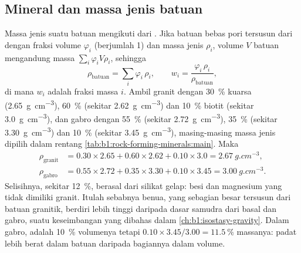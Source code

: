 \subsection{Mineral dan massa jenis batuan}

Massa jenis suatu batuan mengikuti dari . Jika batuan bebas pori tersusun dari  dengan fraksi volume $\varphi_i$ (berjumlah 1) dan massa jenis $\rho_i$, volume $V$ batuan mengandung massa
$\sum_i \varphi_i V \rho_i$, sehingga
\[
  \rho_{\text{batuan}} = \sum_i \varphi_i\,\rho_i ,
  \qquad
  w_i = \frac{\varphi_i\,\rho_i}{\rho_{\text{batuan}}},
\]
di mana $w_i$ adalah fraksi massa  $i$. Ambil granit dengan \qty{30}{\percent} kuarsa (\qty{2.65}{g.cm^{-3}}), \qty{60}{\percent}  (sekitar \qty{2.62}{g.cm^{-3}}) dan \qty{10}{\percent} biotit (sekitar \qty{3.0}{g.cm^{-3}}), dan gabro dengan \qty{55}{\percent}  (sekitar \qty{2.72}{g.cm^{-3}}), \qty{35}{\percent}  (sekitar \qty{3.30}{g.cm^{-3}}) dan \qty{10}{\percent}  (sekitar \qty{3.45}{g.cm^{-3}}), masing-masing massa jenis dipilih dalam rentang \cref{tab:b1:rock-forming-minerals:main}. Maka
\begin{align*}
  \rho_{\text{granit}} &= 0.30\times2.65 + 0.60\times2.62 + 0.10\times3.0
  = \qty{2.67}{g.cm^{-3}},\\
  \rho_{\text{gabro}} &= 0.55\times2.72 + 0.35\times3.30 + 0.10\times3.45
  = \qty{3.00}{g.cm^{-3}}.
\end{align*}
Selisihnya, sekitar \qty{12}{\percent}, berasal dari silikat gelap: besi dan magnesium yang tidak dimiliki granit. Itulah sebabnya benua, yang sebagian besar tersusun dari batuan granitik, berdiri lebih tinggi daripada dasar samudra dari basal dan gabro, suatu keseimbangan yang dibahas dalam \cref{ch:b1:isostasy-gravity}. Dalam gabro,  adalah \qty{10}{\percent} volumenya tetapi $0.10\times3.45/3.00 = \qty{11.5}{\percent}$ massanya:  padat lebih berat dalam batuan daripada bagiannya dalam volume.

